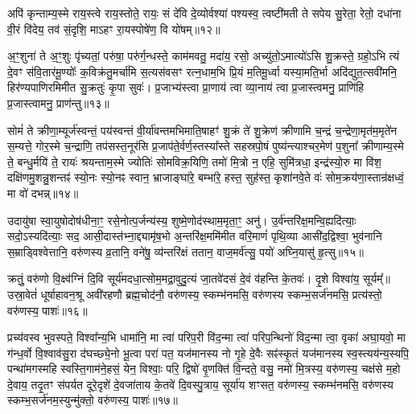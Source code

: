अपि॑ कृन्ताम्य॒स्मे राय॒स्त्वे राय॒स्तोते॒ रायः॒ सं दे॑वि दे॒व्योर्वश्या॑ पश्यस्व॒ त्वष्टी॑मती ते सपेय सु॒रेता॒ रेतो॒ दधा॑ना वी॒रं वि॑देय॒ तव॑ सं॒दृशि॒ मा\-ऽहꣳ रा॒यस्पोषे॑ण॒ वि यो॑षम्॥१२॥

{\anuvakamend[{अ॒स्य॒ ग्री॒वा एका॒न्नत्रि॒ꣳ॒शच्च॑॥५॥}]}

अ॒ꣳ॒शुना॑ ते अ॒ꣳ॒शुः पृ॑च्यतां॒ परु॑षा॒ परु॑र्ग॒न्धस्ते॒ काम॑मवतु॒ मदा॑य॒ रसो॒ अच्यु॑तो॒\-ऽमात्यो॑\-ऽसि शु॒क्रस्ते॒ ग्रहो॒\-ऽभि त्यं दे॒वꣳ स॑वि॒तार॑मू॒ण्योः᳚ क॒विक्र॑तु॒मर्चा॑मि स॒त्यस॑वसꣳ रत्न॒धाम॒भि प्रि॒यं म॒तिमू॒र्ध्वा यस्या॒मति॒र्भा अदि॑द्युत॒त्सवी॑मनि॒ हिर॑ण्यपाणिरमिमीत सु॒क्रतुः॑ कृ॒पा सुवः॑। प्र॒जाभ्य॑स्त्वा प्रा॒णाय॑ त्वा व्या॒नाय॑ त्वा प्र॒जास्त्वमनु॒ प्राणि॑हि प्र॒जास्त्वामनु॒ प्राण॑न्तु॥१३॥

{\anuvakamend[{अनु॑ स॒प्त च॑॥६॥}]}

सोमं॑ ते क्रीणा॒म्यूर्ज॑स्वन्तं॒ पय॑स्वन्तं वी॒र्या॑वन्तमभिमाति॒\-षाहꣳ॑ शु॒क्रं ते॑ शु॒क्रेण॑ क्रीणामि च॒न्द्रं च॒न्द्रेणा॒मृत॑म॒मृते॑न स॒म्यत्ते॒ गोर॒स्मे च॒न्द्राणि॒ तप॑सस्त॒नूर॑सि प्र॒जाप॑ते॒र्वर्ण॒स्तस्या᳚स्ते सहस्रपो॒षं पुष्य॑न्त्याश्चर॒मेण॑ प॒शुना᳚ क्रीणाम्य॒स्मे ते॒ बन्धु॒र्मयि॑ ते॒ रायः॑ श्रयन्ताम॒स्मे ज्योतिः॑ सोमविक्र॒यिणि॒ तमो॑ मि॒त्रो न॒ एहि॒ सुमि॑त्रधा॒ इन्द्र॑स्यो॒रु मा वि॑श॒ दक्षि॑णमु॒शन्नु॒शन्तꣴ॑ स्यो॒नः स्यो॒नꣴ स्वान॒ भ्राजाङ्घा॑रे॒ बम्भा॑रे॒ हस्त॒ सुह॑स्त॒ कृशा॑नवे॒ते वः॑ सोम॒क्रय॑णा॒स्तान्र॑क्षध्वं॒ मा वो॑ दभन्न्॥१४॥

{\anuvakamend[{ऊ॒रुं द्वाविꣳ॑शतिश्व॥७॥}]}

उदायु॑षा स्वा॒युषोदोष॑धीना॒ꣳ॒ रसे॒नोत्प॒र्जन्य॑स्य॒ शुष्मे॒णोद॑स्थाम॒मृता॒ꣳ॒ अनु॑। उ॒र्व॑न्तरि॑क्ष॒मन्वि॒ह्यदि॑त्याः॒ सदो॒\-ऽस्यदि॑त्याः॒ सद॒ आसी॒दास्त॑भ्ना॒द्द्यामृ॑ष॒भो अ॒न्तरि॑क्ष॒ममि॑मीत वरि॒माणं॑ पृथि॒व्या आसी॑द॒द्विश्वा॒ भुव॑नानि स॒म्राड्विश्वेत्तानि॒ वरु॑णस्य व्र॒तानि॒ वने॑षु॒ व्य॑न्तरि॑क्षं ततान॒ वाज॒मर्व॑त्सु॒ पयो॑ अघ्नि॒यासु॑ हृ॒त्सु॥१५॥

क्रतुं॒ वरु॑णो वि॒क्ष्व॑ग्निं दि॒वि सूर्य॑मदधा॒त्सोम॒मद्रा॒वुदु॒त्यं जा॒तवे॑दसं दे॒वं व॑हन्ति के॒तवः॑। दृ॒शे विश्वा॑य॒ सूर्यम्᳚॥ उस्रा॒वेतं॑ धूर्\mbox{}षाहावन॒श्रू अवी॑रहणौ ब्रह्म॒चोद॑नौ॒ वरु॑णस्य॒ स्कम्भ॑नमसि॒ वरु॑णस्य स्कम्भ॒सर्ज॑नमसि॒ प्रत्य॑स्तो॒ वरु॑णस्य॒ पाशः॑॥१६॥

{\anuvakamend[{हृ॒त्सु पञ्च॑त्रिꣳशच्च॥८॥}]}

प्रच्य॑वस्व भुवस्पते॒ विश्वा᳚न्य॒भि धामा॑नि॒ मा त्वा॑ परिप॒री वि॑द॒न्मा त्वा॑ परिप॒न्थिनो॑ विद॒न्मा त्वा॒ वृका॑ अघा॒यवो॒ मा ग॑न्ध॒र्वो वि॒श्वाव॑सु॒रा द॑घच्छ्ये॒नो भू॒त्वा परा॑ पत॒ यज॑मानस्य नो गृ॒हे दे॒वैः सꣴ॑स्कृ॒तं यज॑मानस्य स्व॒स्त्यय॑न्य॒स्यपि॒ पन्था॑मगस्महि स्वस्ति॒गाम॑ने॒हसं॒ येन॒ विश्वाः॒ परि॒ द्विषो॑ वृ॒णक्ति॑ वि॒न्दते॒ वसु॒ नमो॑ मि॒त्रस्य॒ वरु॑णस्य॒ चक्ष॑से म॒हो दे॒वाय॒ तदृ॒तꣳ स॑पर्यत दूरे॒दृशे॑ दे॒वजा॑ताय के॒तवे॑ दि॒वस्पु॒त्राय॒ सूर्या॑य शꣳसत॒ वरु॑णस्य॒ स्कम्भ॑नमसि॒ वरु॑णस्य स्कम्भ॒सर्ज॑नम॒स्युन्मु॑क्तो॒ वरु॑णस्य॒ पाशः॑॥१७॥

